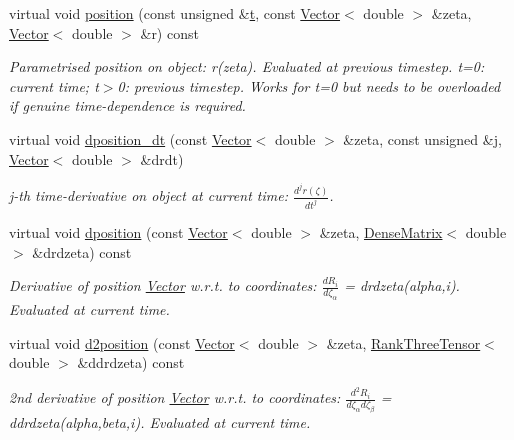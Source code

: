 \begin{DoxyCompactItemize}
virtual void \hyperlink{classoomph_1_1GeomObject_ad44a736d23dcd63af163a7d80b5c4dfa}{position} (const unsigned \&\hyperlink{cfortran_8h_af6f0bd3dc13317f895c91323c25c2b8f}{t}, const \hyperlink{classoomph_1_1Vector}{Vector}$<$ double $>$ \&zeta, \hyperlink{classoomph_1_1Vector}{Vector}$<$ double $>$ \&r) const
\begin{DoxyCompactList}\small\item\em Parametrised position on object\+: r(zeta). Evaluated at previous timestep. t=0\+: current time; t$>$0\+: previous timestep. Works for t=0 but needs to be overloaded if genuine time-\/dependence is required. \end{DoxyCompactList}\item 
virtual void \hyperlink{classoomph_1_1GeomObject_aa46469e491d25eda8dbe213f07152974}{dposition\+\_\+dt} (const \hyperlink{classoomph_1_1Vector}{Vector}$<$ double $>$ \&zeta, const unsigned \&j, \hyperlink{classoomph_1_1Vector}{Vector}$<$ double $>$ \&drdt)
\begin{DoxyCompactList}\small\item\em j-\/th time-\/derivative on object at current time\+: $ \frac{d^{j} r(\zeta)}{dt^j} $. \end{DoxyCompactList}\item 
virtual void \hyperlink{classoomph_1_1GeomObject_a91cd59efcb15971a293914b7b9bd7f75}{dposition} (const \hyperlink{classoomph_1_1Vector}{Vector}$<$ double $>$ \&zeta, \hyperlink{classoomph_1_1DenseMatrix}{Dense\+Matrix}$<$ double $>$ \&drdzeta) const
\begin{DoxyCompactList}\small\item\em Derivative of position \hyperlink{classoomph_1_1Vector}{Vector} w.\+r.\+t. to coordinates\+: $ \frac{dR_i}{d \zeta_\alpha}$ = drdzeta(alpha,i). Evaluated at current time. \end{DoxyCompactList}\item 
virtual void \hyperlink{classoomph_1_1GeomObject_a08472dbe196123490ea109762cefd00c}{d2position} (const \hyperlink{classoomph_1_1Vector}{Vector}$<$ double $>$ \&zeta, \hyperlink{classoomph_1_1RankThreeTensor}{Rank\+Three\+Tensor}$<$ double $>$ \&ddrdzeta) const
\begin{DoxyCompactList}\small\item\em 2nd derivative of position \hyperlink{classoomph_1_1Vector}{Vector} w.\+r.\+t. to coordinates\+: $ \frac{d^2R_i}{d \zeta_\alpha d \zeta_\beta}$ = ddrdzeta(alpha,beta,i). Evaluated at current time. \end{DoxyCompactList}\item 

\end{DoxyCompactItemize}
